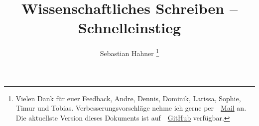\documentclass[10pt,journal,compsoc]{IEEEtran}
\begin{document}
\title{Wissenschaftliches Schreiben -- Schnelleinstieg}
\author{Sebastian Hahner
\thanks{Vielen Dank für euer Feedback, Andre, Dennis, Dominik, Larissa, Sophie, Timur und Tobias. 
Verbesserungsvorschläge nehme ich gerne per \,\faEnvelope\ \href{mailto:hahner@kit.edu}{Mail} an. 
Die aktuellste Version dieses Dokuments ist auf \,\faGithub\ \href{https://github.com/sebinside}{GitHub} verfügbar.
}}


\maketitle



\printbibliography
\end{document}
